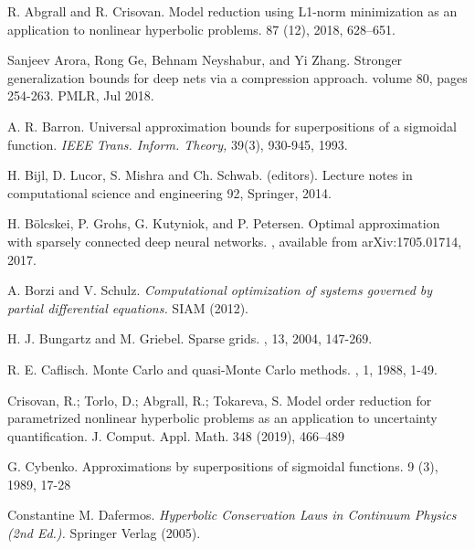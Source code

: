 \documentclass[a4paper]{article}
\numberwithin{equation}{section}
\numberwithin{equation}{section}
\theoremstyle{definition}
\theoremstyle{myremarkstyle}
\begin{document}
\begin{thebibliography}{99}

R. Abgrall and R. Crisovan.
\newblock Model reduction using L1-norm minimization as an application to nonlinear hyperbolic problems. 
  87 (12), 2018, 628–651.


Sanjeev Arora, Rong Ge, Behnam Neyshabur, and Yi Zhang. 
\newblock Stronger generalization bounds for
deep nets via a compression approach. 
 volume 80, pages 254-263. PMLR, Jul 2018.

A. R. Barron. 
\newblock Universal approximation bounds for superpositions of a sigmoidal function.
\emph{IEEE Trans. Inform. Theory,} 39(3), 930-945, 1993.


H. Bijl, D. Lucor, S. Mishra and Ch. Schwab. (editors).
\newblock Lecture notes in computational science and engineering 92, Springer, 2014.

H. B\"olcskei, P. Grohs, G. Kutyniok, and P. Petersen. 
\newblock Optimal approximation with sparsely connected deep
neural networks. 
, available from  arXiv:1705.01714, 2017. 

A. Borzi and V. Schulz.
\newblock \emph{Computational optimization of systems governed by partial differential equations.}
\newblock SIAM (2012).

H. J. Bungartz and M. Griebel.
\newblock Sparse grids.
, 13, 2004, 147-269.

R. E. Caflisch.
\newblock Monte Carlo and quasi-Monte Carlo methods.
, 1, 1988, 1-49.

Crisovan, R.; Torlo, D.; Abgrall, R.; Tokareva, S. Model order reduction for parametrized nonlinear hyperbolic problems as an application to uncertainty quantification. J. Comput. Appl. Math. 348 (2019), 466–489

G. Cybenko.
\newblock Approximations by superpositions of sigmoidal functions.
 9 (3), 1989, 17-28


 Constantine M. Dafermos.
\newblock \emph{Hyperbolic Conservation Laws in Continuum Physics (2nd Ed.).}
\newblock Springer Verlag (2005).



\end{thebibliography}
\end{document}
